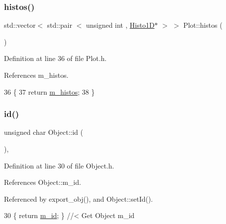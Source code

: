 \subsubsection{\texorpdfstring{histos()}{histos()}}
{\footnotesize\ttfamily std\+::vector$<$ std\+::pair $<$ unsigned int , \hyperlink{classHisto1D}{Histo1D}$\ast$ $>$ $>$ Plot\+::histos (\begin{DoxyParamCaption}{ }\end{DoxyParamCaption})\hspace{0.3cm}{\ttfamily [inline]}}



Definition at line 36 of file Plot.\+h.



References m\+\_\+histos.


\begin{DoxyCode}
36                                                             \{
37     \textcolor{keywordflow}{return} \hyperlink{classPlot_a7edebf2b275223b8ce55f6ef3b2da0cc}{m\_histos};
38   \}
\end{DoxyCode}
\mbox{\label{classObject_af99145335cc61ff6e2798ea17db009d2}} 
\subsubsection{\texorpdfstring{id()}{id()}}
{\footnotesize\ttfamily unsigned char Object\+::id (\begin{DoxyParamCaption}{ }\end{DoxyParamCaption})\hspace{0.3cm}{\ttfamily [inline]}, {\ttfamily [inherited]}}



Definition at line 30 of file Object.\+h.



References Object\+::m\+\_\+id.



Referenced by export\+\_\+obj(), and Object\+::set\+Id().


\begin{DoxyCode}
30 \{ \textcolor{keywordflow}{return} \hyperlink{classObject_aca74b9dbfed7b5556ea2d56c65b6b6b0}{m\_id};         \} \textcolor{comment}{//< Get Object m\_id }
\end{DoxyCode}
\mbox{\label{classObject_a644fd329ea4cb85f54fa6846484b84a8}} 
